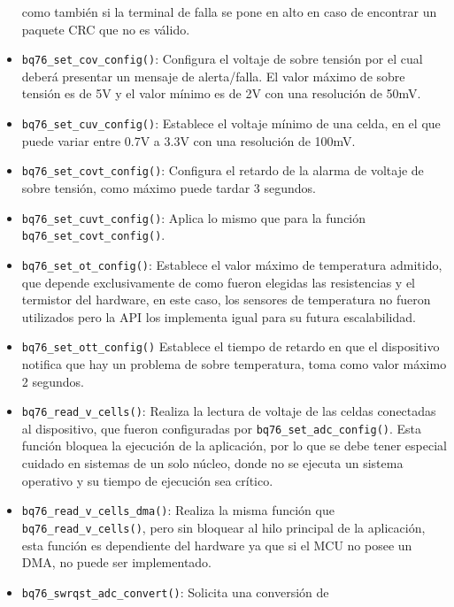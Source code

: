 \documentclass[10pt, a4paper]{report}
\begin{document}
\begin{itemize}
        como tambi\'en si la terminal de falla se pone en alto en caso de
        encontrar un paquete \acrshort{CRC} que no es v\'alido.
    \item \texttt{bq76\_set\_cov\_config()}: Configura el voltaje de sobre
        tensi\'on por el cual deber\'a presentar un mensaje de alerta/falla. El
        valor m\'aximo de sobre tensi\'on es de 5V y el valor m\'inimo es de 2V
        con una resoluci\'on de 50mV.
    \item \texttt{bq76\_set\_cuv\_config()}: Establece el voltaje mínimo de una
        celda, en el que puede variar entre 0.7V a 3.3V con una resoluci\'on de
        100mV.
    \item \texttt{bq76\_set\_covt\_config()}: Configura el retardo de la alarma 
        de voltaje de sobre tensión, como m\'aximo puede tardar 3 segundos.
    \item \texttt{bq76\_set\_cuvt\_config()}: Aplica lo mismo que para la
        funci\'on \texttt{bq76\_set\_covt\_config()}.
    \item \texttt{bq76\_set\_ot\_config()}: Establece el valor m\'aximo de
        temperatura admitido, que depende exclusivamente de como fueron elegidas
        las resistencias y el termistor del hardware, en este caso, los sensores
        de temperatura no fueron utilizados pero la \acrshort{API} los
        implementa igual para su futura escalabilidad.
    \item \texttt{bq76\_set\_ott\_config()} Establece el tiempo de retardo en
        que el dispositivo notifica que hay un problema de sobre temperatura,
        toma como valor m\'aximo 2 segundos.
    \item \texttt{bq76\_read\_v\_cells()}: Realiza la lectura de voltaje de las
        celdas conectadas al dispositivo, que fueron configuradas por
        \texttt{bq76\_set\_adc\_config()}. Esta funci\'on bloquea la ejecuci\'on
        de la aplicaci\'on, por lo que se debe tener especial cuidado en
        sistemas de un solo n\'ucleo, donde no se ejecuta un sistema operativo y
        su tiempo de ejecuci\'on sea cr\'itico.
    \item \texttt{bq76\_read\_v\_cells\_dma()}: Realiza la misma funci\'on que
        \texttt{bq76\_read\_v\_cells()}, pero sin bloquear al hilo principal de
        la aplicaci\'on, esta funci\'on es dependiente del hardware ya que si el
        \acrshort{MCU} no posee un \acrshort{DMA}, no puede ser implementado.
    \item \texttt{bq76\_swrqst\_adc\_convert()}: Solicita una conversi\'on de

\end{itemize}
\end{document}
